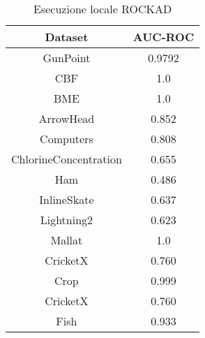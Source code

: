 \begin{table}[h!]
    \centering
    \begin{tabular}{|c|c|}
        \hline
        \textbf{Dataset} & \textbf{AUC-ROC}\\
        \hline
         GunPoint &0.9792 \\
         \hline
         CBF& 1.0\\
         \hline
         BME& 1.0\\
         \hline
         ArrowHead& 0.852\\
         \hline
         Computers& 0.808\\
         \hline
         ChlorineConcentration& 0.655\\
         \hline
         Ham& 0.486\\
         \hline
         InlineSkate& 0.637\\
         \hline
         Lightning2& 0.623\\
         \hline
         Mallat& 1.0\\
         \hline
         CricketX& 0.760\\
         \hline
         Crop& 0.999\\
         \hline
         CricketX& 0.760\\
         \hline
         Fish& 0.933\\
         \hline
    \end{tabular}
    \caption{Esecuzione locale ROCKAD}\label{tab:rockad_paper_table}
\end{table}